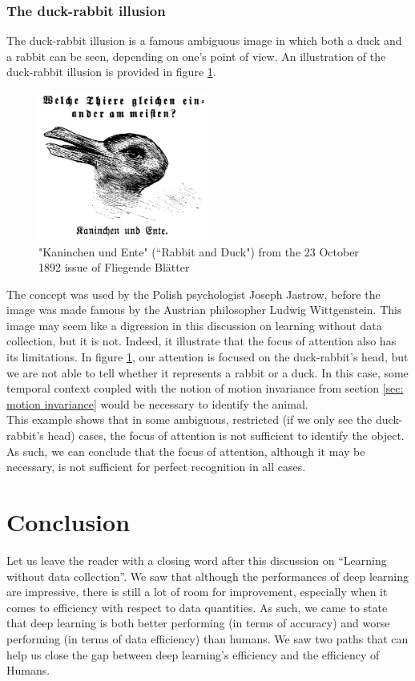 \documentclass[12pt]{article}
\begin{document}
\subsubsection{The duck-rabbit illusion}
The duck-rabbit illusion is a famous ambiguous image in which both a duck and a rabbit can be seen, depending on one's point of view. An illustration of the duck-rabbit illusion is provided in figure \ref{fig: duck-rabbit}.
\begin{figure}[ht]
  \centering
  \includegraphics[width=0.5\textwidth]{images/rabbit_duck.png}
  \caption{"Kaninchen und Ente" (``Rabbit and Duck") from the 23 October 1892 issue of Fliegende Blätter}
  \label{fig: duck-rabbit}
\end{figure}
The concept was used by the Polish psychologist Joseph Jastrow, before the image was made famous by the Austrian philosopher Ludwig Wittgenstein. This image may seem like a digression in this discussion on learning without data collection, but it is not. Indeed, it illustrate that the focus of attention also has its limitations. In figure \ref{fig: duck-rabbit}, our attention is focused on the duck-rabbit's head, but we are not able to tell whether it represents a rabbit or a duck. In this case, some temporal context coupled with the notion of motion invariance from section \ref{sec: motion invariance} would be necessary to identify the animal. \\
This example shows that in some ambiguous, restricted (\eg if we only see the duck-rabbit's head) cases, the focus of attention is not sufficient to identify the object. As such, we can conclude that the focus of attention, although it may be necessary, is not sufficient for perfect recognition in all cases.

\section{Conclusion}
Let us leave the reader with a closing word after this discussion on ``Learning without data collection''. We saw that although the performances of deep learning are impressive, there is still a lot of room for improvement, especially when it comes to efficiency with respect to data quantities. As such, we came to state that deep learning is both better performing (in terms of accuracy) and worse performing (in terms of data efficiency) than humans. We saw two paths that can help us close the gap between deep learning's efficiency and the efficiency of Humans.
\end{document}
